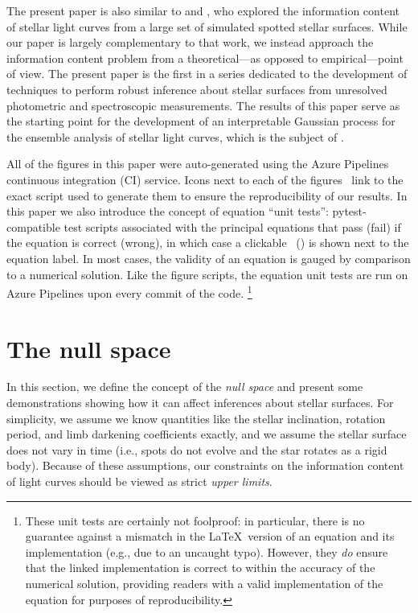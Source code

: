 \documentclass[modern,linenumbers]{aastex62}
\begin{document}
The present paper is also similar to \citet{Walkowicz2013} and
\citet{Basri2020}, who explored the information content of
stellar light curves from a large set of simulated spotted stellar
surfaces. While our paper is largely complementary to
that work, we instead approach the information content problem from
a theoretical---as opposed to empirical---point of view.
%
The present paper is the first in a series dedicated to the development of
techniques to perform robust inference about stellar surfaces from
unresolved photometric and spectroscopic measurements. The results
of this paper serve as the starting point for the development of
an interpretable Gaussian process for the ensemble analysis of
stellar light curves, which is the subject of
.

\vspace{1em}

All of the figures in this paper were auto-generated
using the Azure Pipelines continuous integration (CI) service.
Icons next to each of the figures \codeicon \,
link to the exact script used to generate them to ensure the reproducibility
of our results. In this paper we also introduce the concept of equation
``unit tests'': \textsf{pytest}-compatible test scripts associated
with the principal equations that pass (fail) if the equation is correct (wrong),
in which case a clickable \testpassicon \, (\testfailicon) is shown next to the equation
label.
In most cases, the validity of an equation is gauged by comparison to
a numerical solution. Like the figure scripts, the equation unit tests are
run on Azure Pipelines upon every commit of the code.%
\footnote{
    These unit tests are certainly not foolproof: in particular, there is
    no guarantee against a mismatch in the \LaTeX \, version of an equation
    and its \Python implementation (e.g., due to an uncaught typo). However, they
    \emph{do} ensure that the linked \Python implementation is correct to
    within the accuracy of the numerical solution, providing readers with a
    valid implementation of the equation for purposes of reproducibility.
}

\section{The null space}
\label{sec:nullspace}

In this section, we define the concept of the \emph{null space}
and present some demonstrations showing how it can affect inferences
about stellar surfaces.
For simplicity, we assume we know quantities like the stellar
inclination, rotation period, and limb darkening coefficients
exactly, and we assume the stellar surface does not vary in time
(i.e., spots do not evolve and the star rotates as a rigid body).
Because of these assumptions, our constraints on the information
content of light curves should be viewed as strict \emph{upper limits}.
\end{document}
